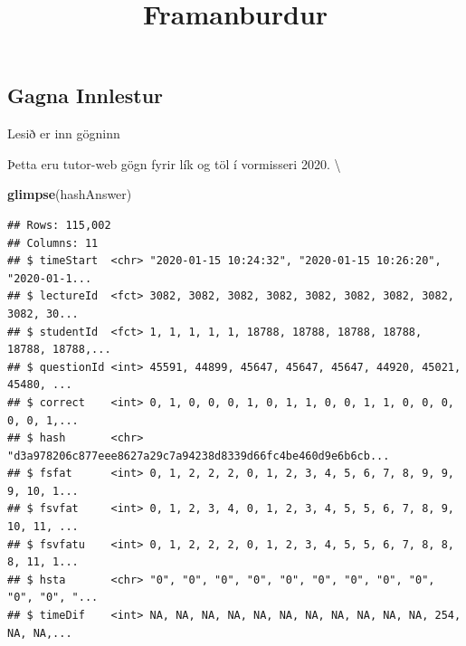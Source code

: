 \documentclass[
]{article}
\title{Framanburdur}
\author{}
\date{\vspace{-2.5em}}
\newenvironment{Shaded}{\begin{snugshade}}{\end{snugshade}}
\newcommand{\DataTypeTok}[1]{\textcolor[rgb]{0.13,0.29,0.53}{#1}}
\newcommand{\KeywordTok}[1]{\textcolor[rgb]{0.13,0.29,0.53}{\textbf{#1}}}
\newcommand{\NormalTok}[1]{#1}
\newcommand{\OperatorTok}[1]{\textcolor[rgb]{0.81,0.36,0.00}{\textbf{#1}}}
\newcommand{\StringTok}[1]{\textcolor[rgb]{0.31,0.60,0.02}{#1}}
\begin{document}
\maketitle

{
\setcounter{tocdepth}{2}
\tableofcontents
}
\hypertarget{gagna-innlestur}{%
\subsection{Gagna Innlestur}\label{gagna-innlestur}}

Lesið er inn gögninn

\begin{Shaded}
\end{Shaded}

Þetta eru tutor-web gögn fyrir lík og töl í vormisseri 2020. \textbackslash{}

\begin{Shaded}
\begin{Highlighting}[]
\KeywordTok{glimpse}\NormalTok{(hashAnswer)}
\end{Highlighting}
\end{Shaded}

\begin{verbatim}
## Rows: 115,002
## Columns: 11
## $ timeStart  <chr> "2020-01-15 10:24:32", "2020-01-15 10:26:20", "2020-01-1...
## $ lectureId  <fct> 3082, 3082, 3082, 3082, 3082, 3082, 3082, 3082, 3082, 30...
## $ studentId  <fct> 1, 1, 1, 1, 1, 18788, 18788, 18788, 18788, 18788, 18788,...
## $ questionId <int> 45591, 44899, 45647, 45647, 45647, 44920, 45021, 45480, ...
## $ correct    <int> 0, 1, 0, 0, 0, 1, 0, 1, 1, 0, 0, 1, 1, 0, 0, 0, 0, 0, 1,...
## $ hash       <chr> "d3a978206c877eee8627a29c7a94238d8339d66fc4be460d9e6b6cb...
## $ fsfat      <int> 0, 1, 2, 2, 2, 0, 1, 2, 3, 4, 5, 6, 7, 8, 9, 9, 9, 10, 1...
## $ fsvfat     <int> 0, 1, 2, 3, 4, 0, 1, 2, 3, 4, 5, 5, 6, 7, 8, 9, 10, 11, ...
## $ fsvfatu    <int> 0, 1, 2, 2, 2, 0, 1, 2, 3, 4, 5, 5, 6, 7, 8, 8, 8, 11, 1...
## $ hsta       <chr> "0", "0", "0", "0", "0", "0", "0", "0", "0", "0", "0", "...
## $ timeDif    <int> NA, NA, NA, NA, NA, NA, NA, NA, NA, NA, NA, 254, NA, NA,...
\end{verbatim}
\end{document}
